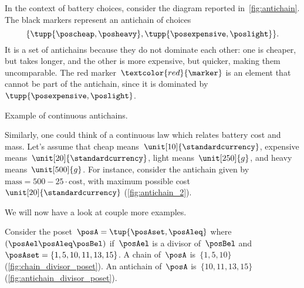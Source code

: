 In the context of battery choices, consider the diagram reported in~\cref{fig:antichain}.
The black markers represent an antichain of choices
\begin{equation}
	\{
	\tupp{\poscheap,\posheavy},
	\tupp{\posexpensive,\poslight}
	\}.
\end{equation}
It is a set of antichains because they do not dominate each other: one is cheaper, but takes longer, and the other is more expensive, but quicker, making them uncomparable.
The red marker~$\textcolor{red}{\marker}$ is an element that cannot be part of the antichain, since it is dominated by~$\tupp{\posexpensive,\poslight}$.

%
\begin{marginfigure}
	\centering
	\caption{Example of continuous antichains.}
	\label{fig:antichain_2}
\end{marginfigure}

Similarly, one could think of a continuous law which relates battery cost and mass.
Let's assume that cheap means~$\unit[10]{\standardcurrency}$, expensive means~$\unit[20]{\standardcurrency}$, light means~$\unit[250]{g}$, and heavy means~$\unit[500]{g}$.
For instance, consider the antichain given by~$\text{mass}=500-25\cdot \text{cost}$, with maximum possible cost~$\unit[20]{\standardcurrency}$ (\cref{fig:antichain_2}).

We will now have a look at couple more examples.
\begin{example}
	Consider the poset~$\posA=\tup{\posAset,\posAleq}$ where~$(\posAel \posAleq \posBel)$ if~$\posAel$ is a divisor of~$\posBel$ and~$\posAset=\{1,5,10,11,13,15\}$.
	A chain of~$\posA$ is~$\{1,5,10\}$ (\cref{fig:chain_divisor_poset}).
	An antichain of~$\posA$ is~$\{10,11,13,15\}$ (\cref{fig:antichain_divisor_poset}).
\end{example}

\begin{marginfigure}
	\begin{center}
	\end{center}
	\caption{\label{fig:chain_divisor_poset}}
\end{marginfigure}

\begin{marginfigure}
	\begin{center}
	\end{center}
	\caption{\label{fig:antichain_divisor_poset}}
\end{marginfigure}

